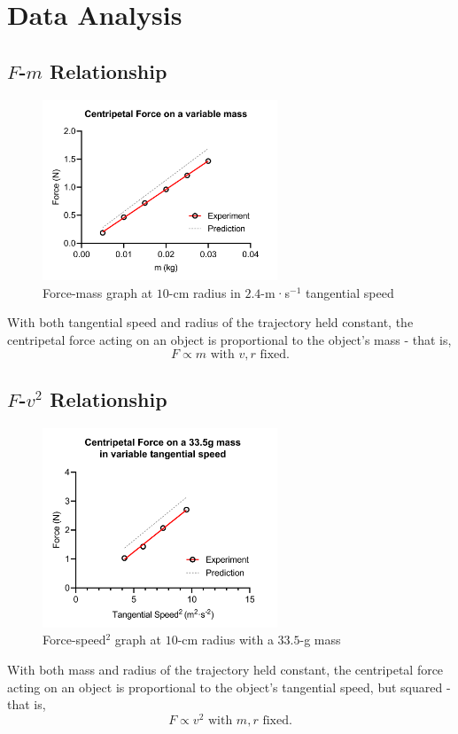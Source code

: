 

\rmfamily
\section{Data Analysis}
\subsection{$F$-$m$ Relationship}
\begin{figure}[H]
	\centering\includegraphics[width=7cm]{fm}
	\caption{Force-mass graph at $10$-cm radius in $2.4$-m·s$^{-1}$ tangential speed}
	\label{$Frequency-Intensity$ Graph for $70$cm tube}
\end{figure}
With both tangential speed and radius of the trajectory held constant, the centripetal force acting on an object is proportional to  the object's mass - that is, $$F\propto m\text{         with } v,r \text{ fixed.}$$


\subsection{$F$-${v}^2$ Relationship}
\begin{figure}[H]
	\centering\includegraphics[width=7cm]{fv}
	\caption{Force-speed$^2$ graph at $10$-cm radius with a $33.5$-g mass}
	\label{$Frequency-Intensity$ Graph for $70$cm tube}
\end{figure}
With both mass and radius of the trajectory held constant, the centripetal force acting on an object is proportional to  the object's tangential speed, but squared - that is, $$F\propto v^2\text{         with } m,r \text{ fixed.}$$


